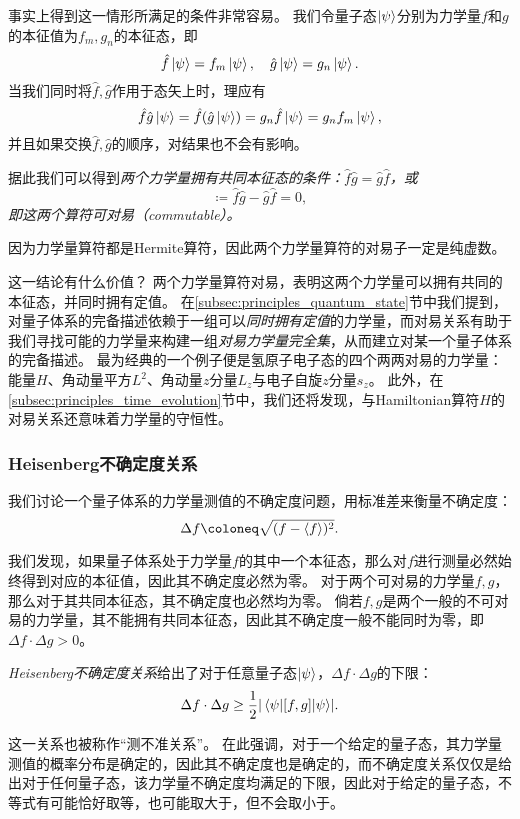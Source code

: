 事实上得到这一情形所满足的条件非常容易。
我们令量子态$\ket{\psi}$分别为力学量$f$和$g$的本征值为$f_m, g_n$的本征态，即
\begin{equation}
    \hat{f}\ket{\psi} = f_m\ket{\psi},\quad \hat{g}\ket{\psi} = g_n\ket{\psi}.
\end{equation}
当我们同时将$\hat{f},\hat{g}$作用于态矢上时，理应有
\begin{equation}
    \hat{f}\hat{g}\ket{\psi} = \hat{f}(\hat{g}\ket{\psi}) = g_n \hat{f}\ket{\psi} = g_n f_m \ket{\psi},
\end{equation}
并且如果交换$\hat{f},\hat{g}$的顺序，对结果也不会有影响。
\begin{tcolorbox}
据此我们可以得到\emph{两个力学量拥有共同本征态的条件：}$\hat{f}\hat{g}=\hat{g}\hat{f}$\emph{，或}
\begin{equation}
    [f,g] \coloneq \hat{f}\hat{g}-\hat{g}\hat{f} = 0,
\end{equation}
\emph{即这两个算符可对易（commutable）。}
\end{tcolorbox}
因为力学量算符都是Hermite算符，因此两个力学量算符的对易子一定是纯虚数。

这一结论有什么价值？
两个力学量算符对易，表明这两个力学量可以拥有共同的本征态，并同时拥有定值。
在\ref{subsec:principles_quantum_state}节中我们提到，对量子体系的完备描述依赖于一组可以\emph{同时拥有定值}的力学量，而对易关系有助于我们寻找可能的力学量来构建一组\emph{对易力学量完全集}，从而建立对某一个量子体系的完备描述。
最为经典的一个例子便是氢原子电子态的四个两两对易的力学量：能量$H$、角动量平方$L^2$、角动量$z$分量$L_z$与电子自旋$z$分量$s_z$。
此外，在\ref{subsec:principles_time_evolution}节中，我们还将发现，与Hamiltonian算符$H$的对易关系还意味着力学量的守恒性。

\subsubsection{Heisenberg不确定度关系}

我们讨论一个量子体系的力学量测值的不确定度问题，用标准差来衡量不确定度：
\begin{equation}
    \Delta f \coloneq \sqrt{(f-\expval{f})^2}.
\end{equation}

我们发现，如果量子体系处于力学量$f$的其中一个本征态，那么对$f$进行测量必然始终得到对应的本征值，因此其不确定度必然为零。
对于两个可对易的力学量$f,g$，那么对于其共同本征态，其不确定度也必然均为零。
倘若$f,g$是两个一般的不可对易的力学量，其不能拥有共同本征态，因此其不确定度一般不能同时为零，即$\Delta f \cdot \Delta g > 0$。
\begin{tcolorbox}
\emph{Heisenberg不确定度关系}给出了对于任意量子态$\ket{\psi}$，$\Delta f \cdot \Delta g$的下限：
\begin{equation}
    \label{eq:principle_uncertainty_relation}
    \Delta f \cdot \Delta g \geq \frac12 \abs{\mel{\psi}{[f,g]}{\psi}}.
\end{equation}
\end{tcolorbox}
这一关系也被称作“测不准关系”。
在此强调，对于一个给定的量子态，其力学量测值的概率分布是确定的，因此其不确定度也是确定的，而不确定度关系仅仅是给出对于任何量子态，该力学量不确定度均满足的下限，因此对于给定的量子态，不等式有可能恰好取等，也可能取大于，但不会取小于。

